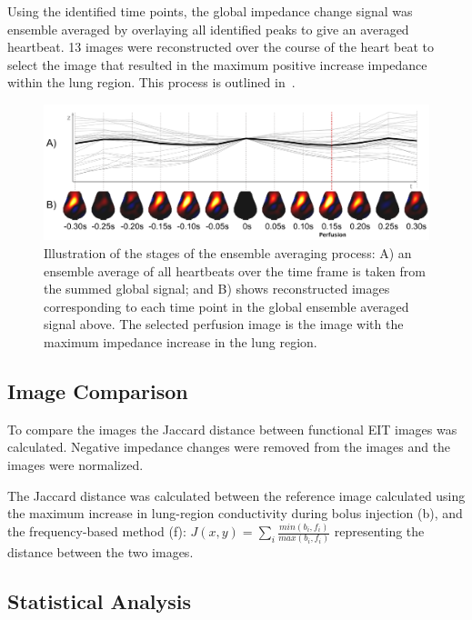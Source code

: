 Using the identified time points, the global impedance change signal 
was ensemble averaged by overlaying all identified peaks 
to give an averaged heartbeat. 13 images were reconstructed over the 
course of the heart beat to select the image that resulted in the maximum 
positive increase impedance within the lung region. This process is outlined 
in~.

\begin{figure}[H]
\centering
\includegraphics[width=\textwidth]{chapter3-perfusion_analysis/imgs/fig-methodsTime.pdf}
\caption[Ensemble averaging analysis]{\label{fig:timeAnalysis}%
Illustration of the stages of the ensemble averaging process:
A) an ensemble average of all heartbeats over the time frame is taken from the 
summed global signal; and 
B) shows reconstructed images corresponding to each time point 
in the global ensemble averaged signal above.
The selected perfusion image is the image with the maximum impedance increase in the 
lung region.
}

\end{figure}

\subsection{Image Comparison}

To compare the images the Jaccard 
distance between functional EIT images was calculated. 
Negative impedance changes were removed from the images
and the images were normalized.

The Jaccard distance was calculated between the reference image 
calculated using the maximum increase in lung-region conductivity during 
bolus injection (b), and the frequency-based method (f):
$J(x,y) = \sum_{i}\frac{min(b_i,f_i)}{max(b_i,f_i)}$
representing the distance between the two images.

\subsection{Statistical Analysis}

